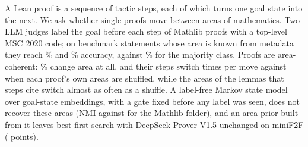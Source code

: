 A Lean proof is a sequence of tactic steps, each of which turns one goal state
into the next. We ask whether single proofs move between areas of mathematics.
Two LLM judges label the goal before each step of \resSwitchJudgeProofs{}
Mathlib proofs with a top-level MSC 2020 code; on benchmark statements whose
area is known from metadata they reach \resGoldAccHaiku\% and
\resGoldAccSonnet\% accuracy, against \resGoldMajority\% for the majority
class. Proofs are area-coherent: \resSwitchJudgeHas\% change area at all, and
their steps switch \resSwitchJudgeRate{} times per move against
\resSwitchJudgeRateShuffle{} when each proof's own areas are shuffled, while
the areas of the lemmas that steps cite switch almost as often as a shuffle.
A label-free Markov state model over goal-state embeddings, with a gate fixed
before any label was seen, does not recover these areas (NMI \resMacroNMI{}
against \resFolderNMI{} for the Mathlib folder), and an area prior built from
it leaves best-first search with DeepSeek-Prover-V1.5 unchanged on miniF2F
(\resSearchGainMiniF{} points).
